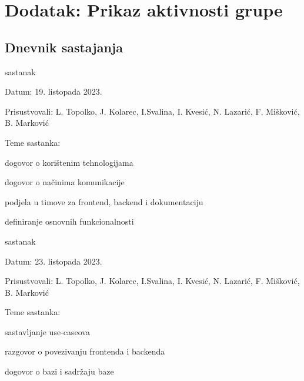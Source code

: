 \chapter*{Dodatak: Prikaz aktivnosti grupe}
		
		\section*{Dnevnik sastajanja}
		
		\begin{packed_enum}
			\item  sastanak
			
			\item[] \begin{packed_item}
				\item Datum: 19. listopada 2023.
				\item Prisustvovali: L. Topolko, J. Kolarec, I.Svalina, I. Kvesić, N. Lazarić, F. Mišković, B. Marković
				\item Teme sastanka:
				\begin{packed_item}
					\item dogovor o korištenim tehnologijama
					\item dogovor o načinima komunikacije
					\item podjela u timove za frontend, backend i dokumentaciju
					\item definiranje osnovnih funkcionalnosti
				\end{packed_item}
			\end{packed_item}
			
			\item  sastanak
			\item[] \begin{packed_item}
				\item Datum: 23. listopada 2023.
				\item Prisustvovali: L. Topolko, J. Kolarec, I.Svalina, I. Kvesić, N. Lazarić, F. Mišković, B. Marković
				\item Teme sastanka:
				\begin{packed_item}
					\item sastavljanje use-caseova
					\item razgovor o povezivanju frontenda i backenda
					\item dogovor o bazi i sadržaju baze
				\end{packed_item}
			\end{packed_item}
			

\end{packed_enum}

